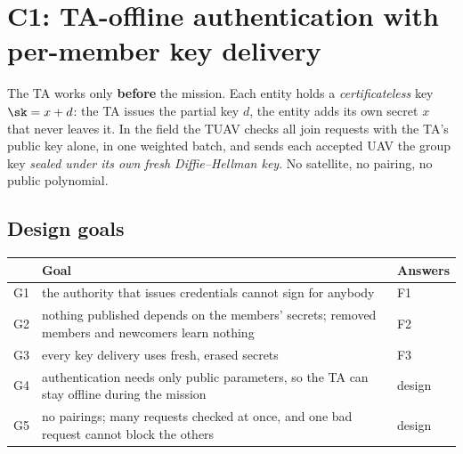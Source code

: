 \chapter{C1: TA-offline authentication with per-member key delivery}\label{ch:c1}
\begin{keybox}[colframe=uavc,colback=uavc!5]
The TA works only \textbf{before} the mission. Each entity holds a \emph{certificateless} key $\sk=x+d$: the TA issues the partial key $d$, the entity adds
its own secret $x$ that never leaves it. In the field the TUAV checks all join requests with the TA's public key alone, in one weighted batch, and
sends each accepted UAV the group key \emph{sealed under its own fresh Diffie--Hellman key}. No satellite, no pairing, no public polynomial.
\end{keybox}

\section{Design goals}
\begin{center}
\small
\begin{tabularx}{\linewidth}{@{}l X l@{}}
\toprule
& \textbf{Goal} & \textbf{Answers}\\
\midrule
G1 & the authority that issues credentials cannot sign for anybody & F1\\
G2 & nothing published depends on the members' secrets; removed members and newcomers learn nothing & F2\\
G3 & every key delivery uses fresh, erased secrets & F3\\
G4 & authentication needs only public parameters, so the TA can stay offline during the mission & design\\
G5 & no pairings; many requests checked at once, and one bad request cannot block the others & design\\
\bottomrule
\end{tabularx}
\end{center}

